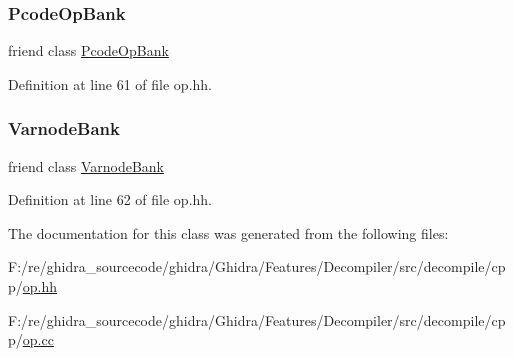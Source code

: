 \subsubsection{\texorpdfstring{PcodeOpBank}{PcodeOpBank}}
{\footnotesize\ttfamily friend class \mbox{\hyperlink{class_pcode_op_bank}{Pcode\+Op\+Bank}}\hspace{0.3cm}{\ttfamily [friend]}}



Definition at line 61 of file op.\+hh.

\mbox{\label{class_pcode_op_a794a269a99c505d3cd54abc16c456e0d}} 
\subsubsection{\texorpdfstring{VarnodeBank}{VarnodeBank}}
{\footnotesize\ttfamily friend class \mbox{\hyperlink{class_varnode_bank}{Varnode\+Bank}}\hspace{0.3cm}{\ttfamily [friend]}}



Definition at line 62 of file op.\+hh.



The documentation for this class was generated from the following files\+:\begin{DoxyCompactItemize}
\item 
F\+:/re/ghidra\+\_\+sourcecode/ghidra/\+Ghidra/\+Features/\+Decompiler/src/decompile/cpp/\mbox{\hyperlink{op_8hh}{op.\+hh}}\item 
F\+:/re/ghidra\+\_\+sourcecode/ghidra/\+Ghidra/\+Features/\+Decompiler/src/decompile/cpp/\mbox{\hyperlink{op_8cc}{op.\+cc}}\end{DoxyCompactItemize}
